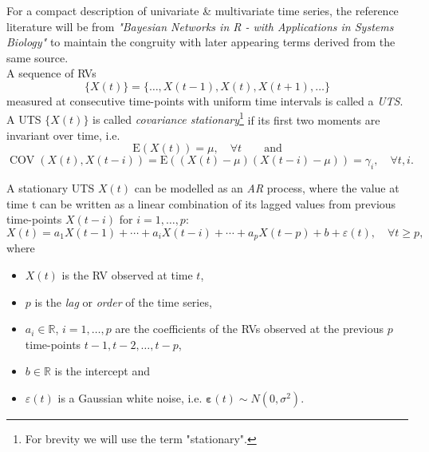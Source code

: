 
For a compact description of {univariate \& multivariate time series, the reference literature will be from \textit{"Bayesian Networks in R - with Applications in Systems Biology"} \citep{nagarajan2013bayesian} to maintain the congruity with later appearing terms derived from the same source.
\\

A sequence of \acp{RV} 
\begin{equation}
\{X(t)\}=\{\ldots, X(t-1), X(t), X(t+1), \ldots\}
\end{equation}
measured at consecutive time-points with uniform time intervals is called a \textit{\ac{UTS}}. A \ac{UTS} $\{X(t)\}$ is called \textit{covariance stationary}\footnote{For brevity we will use the term "stationary".}} if its first two moments are invariant over time, i.e.
\begin{equation}
\mathrm{E}(X(t))=\mu, \quad \forall t \qquad \text{and}
\end{equation}
\begin{equation} \operatorname{COV}(X(t), X(t-i))=\mathrm{E}((X(t)-\mu)(X(t-i)-\mu))=\gamma_{i}, \quad \forall t, i.
\end{equation}

A stationary \ac{UTS} $X(t)$ can be modelled as an \textit{\ac{AR}} process, where the value at time t can be written as a linear combination of its lagged values from previous time-points $X(t-i)$ for $i=1,\ldots,p$:
\begin{equation}
 X(t)=a_{1} X(t-1)+\cdots+a_{i} X(t-i)+\cdots+a_{p} X(t-p)+b+\varepsilon(t), \quad \forall t \geqslant p,
 \label{eq:univariate_ts}
\end{equation}
where
\begin{itemize}
\item $X(t)$ is the \ac{RV} observed at time $t$,
\item $p$ is the \textit{lag} or \textit{order} of the time series,
\item $a_{i} \in \mathbb{R}$, $i=1, \ldots, p$ are the coefficients of the \acp{RV} observed at the previous $p$ time-points $t-1, t-2, \ldots, t-p$,
\item $b \in \mathbb{R}$ is the intercept and
\item $\varepsilon(t)$ is a Gaussian white noise, i.e. $\boldsymbol{\varepsilon}(t) \sim N\left(0, \sigma^{2}\right)$. 
\end{itemize}


